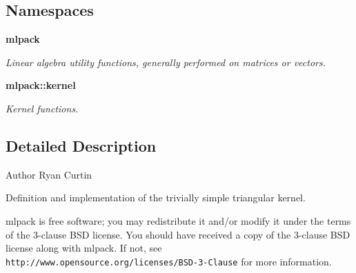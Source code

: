 \subsection*{Namespaces}
\begin{DoxyCompactItemize}
\item 
 \textbf{ mlpack}
\begin{DoxyCompactList}\small\item\em Linear algebra utility functions, generally performed on matrices or vectors. \end{DoxyCompactList}\item 
 \textbf{ mlpack\+::kernel}
\begin{DoxyCompactList}\small\item\em Kernel functions. \end{DoxyCompactList}\end{DoxyCompactItemize}


\subsection{Detailed Description}
\begin{DoxyAuthor}{Author}
Ryan Curtin
\end{DoxyAuthor}
Definition and implementation of the trivially simple triangular kernel.

mlpack is free software; you may redistribute it and/or modify it under the terms of the 3-\/clause B\+SD license. You should have received a copy of the 3-\/clause B\+SD license along with mlpack. If not, see {\tt http\+://www.\+opensource.\+org/licenses/\+B\+S\+D-\/3-\/\+Clause} for more information. 